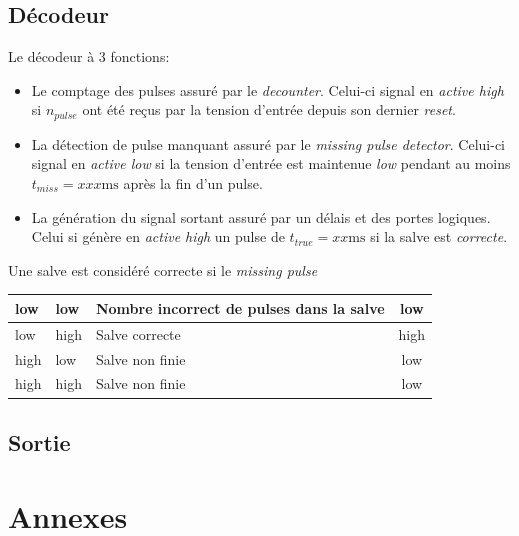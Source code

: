\documentclass[french]{layout/Report}
\begin{document}
\subsection{Décodeur}
Le décodeur à 3 fonctions:
\begin{itemize}
    \item{Le comptage des pulses assuré par le \emph{decounter}. Celui-ci signal en \emph{active high} si $n_{pulse}$ ont été reçus par la tension d'entrée depuis son dernier \emph{reset}.}
    \item{La détection de pulse manquant assuré par le \emph{missing pulse detector}. Celui-ci signal en \emph{active low} si la tension d'entrée est maintenue \emph{low} pendant au moins $t_{miss} = xxx \si{\milli\second}$ après la fin d'un pulse.}
    \item{La génération du signal sortant assuré par un délais et des portes logiques. Celui si génère en \emph{active high} un pulse de $t_{true} = xx\si{\milli\second}$ si la salve est \emph{correcte}.}
\end{itemize}

Une salve est considéré correcte si le \emph{missing pulse }
\begin{center}
    \begin{tabular}{| m{4cm} | m{4cm} | l | c |}
        \hline
        low     & low       & Nombre incorrect de pulses dans la salve & low \\ \hline
        low     & high  & Salve correcte    & high\\ \hline
        high    & low       & Salve non finie & low \\ \hline
        high    & high  & Salve non finie & low \\ \hline
    \end{tabular}
\end{center}

\subsection{Sortie}

\section{Annexes}
\end{document}
